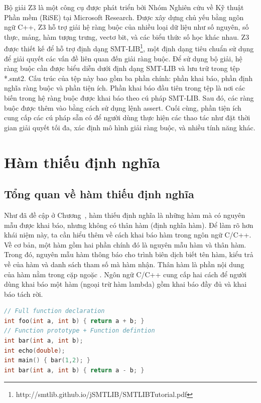 Bộ giải Z3 là một công cụ được phát triển bởi Nhóm Nghiên cứu về Kỹ thuật Phần mềm (RiSE) tại Microsoft Research. Được xây dựng chủ yếu bằng ngôn ngữ C++, Z3 hỗ trợ giải hệ ràng buộc của nhiều loại dữ liệu như số nguyên, số thực, mảng, hàm tượng trưng, vectơ bit, và các biểu thức số học khác nhau. Z3 được thiết kế để hỗ trợ định dạng SMT-LIB\footnote{http://smtlib.github.io/jSMTLIB/SMTLIBTutorial.pdf}, một định dạng tiêu chuẩn sử dụng để giải quyết các vấn đề liên quan đến giải ràng buộc. Để sử dụng bộ giải, hệ ràng buộc cần được biểu diễn dưới định dạng SMT-LIB và lưu trữ trong tệp *.smt2. Cấu trúc của tệp này bao gồm ba phần chính: phần khai báo, phần định nghĩa ràng buộc và phần tiện ích. Phần khai báo đầu tiên trong tệp là nơi các biến trong hệ ràng buộc được khai báo theo cú pháp SMT-LIB. Sau đó, các ràng buộc được thêm vào bằng cách sử dụng lệnh assert. Cuối cùng, phần tiện ích cung cấp các cú pháp sẵn có để người dùng thực hiện các thao tác như đặt thời gian giải quyết tối đa, xác định mô hình giải ràng buộc, và nhiều tính năng khác.

\section{Hàm thiếu định nghĩa} \label{sec:kno-undefine}
\subsection{Tổng quan về hàm thiếu định nghĩa}
Như đã đề cập ở Chương~, hàm thiếu định nghĩa là những hàm mà có nguyên mẫu được khai báo, nhưng không có thân hàm (định nghĩa hàm). Để làm rõ hơn khái niệm này, ta cần hiểu thêm về cách khai báo hàm trong ngôn ngữ C/C++. Về cơ bản, một hàm gồm hai phần chính đó là nguyên mẫu hàm và thân hàm. Trong đó, nguyên mẫu hàm thông báo cho trình biên dịch biết tên hàm, kiểu trả về của hàm và danh sách tham số mà hàm nhận. Thân hàm là phần nội dung của hàm nằm trong cặp ngoặc \tcode{\{\}}. Ngôn ngữ C/C++ cung cấp hai cách để người dùng khai báo một hàm (ngoại trừ hàm lambda) gồm khai báo đầy đủ và khai báo tách rời.
\vspace{5mm}
\begin{lstlisting}[language=C++, captionpos=b, caption={Ví dụ về khai báo hàm đầy đủ và khai báo hàm tách rời.}, label={cod:kno-undef}]
// Full function declaration
int foo(int a, int b) { return a + b; }
// Function prototype + Function defintion 
int bar(int a, int b);
int echo(double);
int main() { bar(1,2); }
int bar(int a, int b) { return a - b; }
\end{lstlisting}

